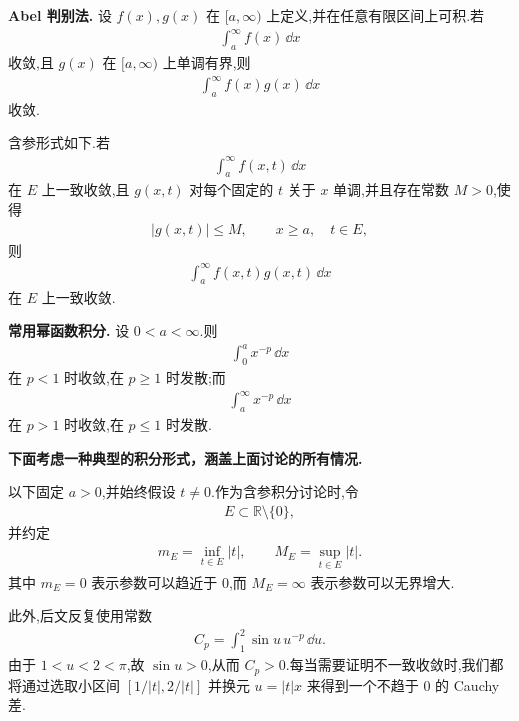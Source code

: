 \textbf{Abel 判别法.}
设 $f(x),g(x)$ 在 $[a,\infty)$ 上定义,并在任意有限区间上可积.若
\begin{align*}
	\int_a^\infty f(x)\,\dd x
\end{align*}
收敛,且 $g(x)$ 在 $[a,\infty)$ 上单调有界,则
\begin{align*}
	\int_a^\infty f(x)g(x)\,\dd x
\end{align*}
收敛.

含参形式如下.若
\begin{align*}
	\int_a^\infty f(x,t)\,\dd x
\end{align*}
在 $E$ 上一致收敛,且 $g(x,t)$ 对每个固定的 $t$ 关于 $x$ 单调,并且存在常数 $M>0$,使得
\begin{align*}
	|g(x,t)|\leq M,
	\qquad x\geq a,
	\quad t\in E,
\end{align*}
则
\begin{align*}
	\int_a^\infty f(x,t)g(x,t)\,\dd x
\end{align*}
在 $E$ 上一致收敛.

\textbf{常用幂函数积分.}
设 $0<a<\infty$.则
\begin{align*}
	\int_0^a x^{-p}\,\dd x
\end{align*}
在 $p<1$ 时收敛,在 $p\geq1$ 时发散;而
\begin{align*}
	\int_a^\infty x^{-p}\,\dd x
\end{align*}
在 $p>1$ 时收敛,在 $p\leq1$ 时发散.

\textbf{下面考虑一种典型的积分形式，涵盖上面讨论的所有情况.}

以下固定 $a>0$,并始终假设 $t\neq0$.作为含参积分讨论时,令
\begin{align*}
	E\subset\mathbb R\setminus\{0\},
\end{align*}
并约定
\begin{align*}
	m_E=\inf_{t\in E}|t|,
	\qquad
	M_E=\sup_{t\in E}|t|.
\end{align*}
其中 $m_E=0$ 表示参数可以趋近于 $0$,而 $M_E=\infty$ 表示参数可以无界增大.

此外,后文反复使用常数
\begin{align*}
	C_p=\int_1^2\sin u\,u^{-p}\,\dd u.
\end{align*}
由于 $1<u<2<\pi$,故 $\sin u>0$,从而 $C_p>0$.每当需要证明不一致收敛时,我们都将通过选取小区间 $[1/|t|,2/|t|]$ 并换元 $u=|t|x$ 来得到一个不趋于 $0$ 的 Cauchy 差.

